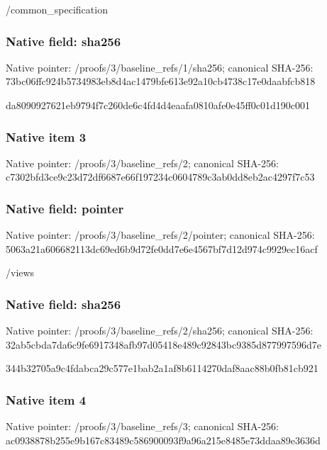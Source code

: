 \documentclass[10pt,a4paper]{article}
\begin{document}
\begingroup\raggedright\sloppy /\allowbreak{}common\_\allowbreak{}specification\par\endgroup

\subsubsection{Native field: sha256}
Native pointer: /proofs/3/baseline\_\allowbreak{}refs/1/sha256; canonical SHA-256: 73bc06ffc924b5734983eb8d4ac1479bfe613e92a10cb4738c17e0daabfcb818

\begingroup\raggedright\sloppy da8090927621eb9794f7c260de6c4fd4d4eaafa0810afe0e45ff0c01d190c001\par\endgroup

\subsubsection{Native item 3}
Native pointer: /proofs/3/baseline\_\allowbreak{}refs/2; canonical SHA-256: c7302bfd3ce9c23d72df6687e66f197234c0604789c3ab0dd8eb2ac4297f7c53

\subsubsection{Native field: pointer}
Native pointer: /proofs/3/baseline\_\allowbreak{}refs/2/pointer; canonical SHA-256: 5063a21a606682113dc69ed6b9d72fe0dd7e6e4567bf7d12d974c9929ec16acf

\begingroup\raggedright\sloppy /\allowbreak{}views\par\endgroup

\subsubsection{Native field: sha256}
Native pointer: /proofs/3/baseline\_\allowbreak{}refs/2/sha256; canonical SHA-256: 32ab5cbda7da6c9fe6917348afb97d05418e489c92843bc9385d877997596d7e

\begingroup\raggedright\sloppy 344b32705a9c4fdabca29c577e1bab2a1af8b6114270daf8aac88b0fb81cb921\par\endgroup

\subsubsection{Native item 4}
Native pointer: /proofs/3/baseline\_\allowbreak{}refs/3; canonical SHA-256: ac0938878b255e9b167c83489c586900093f9a96a215e8485e73ddaa89e3636d
\end{document}
